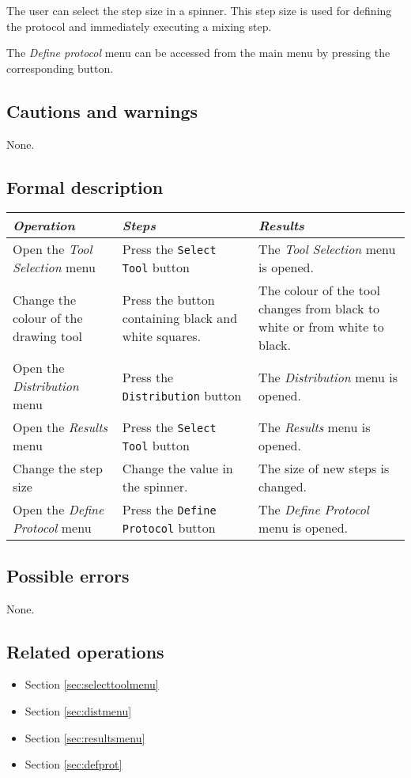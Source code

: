   The user can select the step size in a spinner. This step size is used for defining the protocol and immediately executing a mixing step.
  
  The \emph{Define protocol} menu can be accessed from the main menu by pressing the corresponding button.
  
  \subsection*{Cautions and warnings}
  None.

  \subsection*{Formal description}
  \begin{tabularx}{\textwidth}{XXX}
    \toprule
    \emph{Operation} & \emph{Steps} & \emph{Results} \\
    \midrule
    Open the \emph{Tool Selection} menu & Press the \texttt{Select Tool} button & The \emph{Tool Selection} menu is opened. \\
    \midrule
    Change the colour of the drawing tool & Press the button containing black and white squares. & The colour of the tool changes from black to white or from white to black. \\
    \midrule
    Open the \emph{Distribution} menu & Press the \texttt{Distribution} button & The \emph{Distribution} menu is opened. \\
    \midrule
    Open the \emph{Results} menu & Press the \texttt{Select Tool} button & The \emph{Results} menu is opened. \\
    \midrule
    Change the step size & Change the value in the spinner. & The size of new steps is changed. \\
    \midrule
    Open the \emph{Define Protocol} menu & Press the \texttt{Define Protocol} button & The \emph{Define Protocol} menu is opened. \\
    \bottomrule
  \end{tabularx}

  \subsection*{Possible errors}
  None.

  \subsection*{Related operations}
  \begin{itemize}
    \item Section \ref{sec:selecttoolmenu}
    \item Section \ref{sec:distmenu}
    \item Section \ref{sec:resultsmenu}
    \item Section \ref{sec:defprot}
  \end{itemize}

